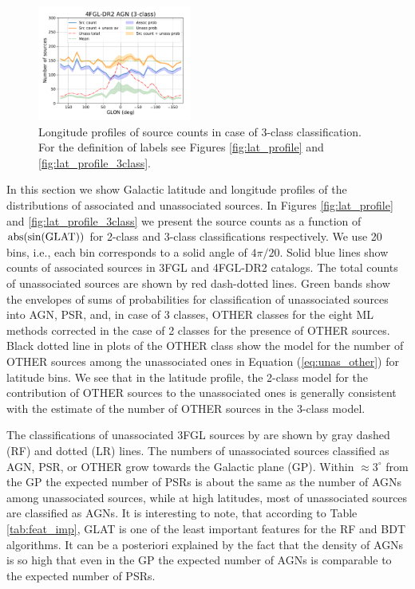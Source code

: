 \begin{figure}[h]
\includegraphics[width=0.45\textwidth]{plots/lon_profile_AGN_4FGL-DR2_3classes.pdf}
\caption{Longitude profiles of source counts in case of 3-class classification. For the definition of labels see Figures \ref{fig:lat_profile} and \ref{fig:lat_profile_3class}.}  
\label{fig:lon_profile_3class}
\end{figure}


In this section we show Galactic latitude and longitude profiles of the distributions of associated and unassociated sources.
In Figures \ref{fig:lat_profile} and \ref{fig:lat_profile_3class} we present the source counts as a function of ${\rm abs(sin(GLAT))}$ 
for 2-class and 3-class classifications respectively.
We use 20 bins, i.e., each bin corresponds to a solid angle of $4 \pi / 20$. 
Solid blue lines show counts of associated sources in 3FGL and 4FGL-DR2  catalogs.
The total counts of unassociated sources are shown by red dash-dotted lines.
Green bands show the envelopes of sums of probabilities for classification of unassociated sources into AGN, PSR, and, in case of 3 classes, OTHER classes for the eight ML methods corrected in the case of 2 classes for the presence of OTHER sources.
Black dotted line in plots of the OTHER class show the model for the number of OTHER sources among the unassociated ones
in Equation (\ref{eq:unas_other}) for latitude bins.
We see that in the latitude profile, the 2-class model for the contribution of OTHER sources to the unassociated ones is generally consistent with the estimate of the number of OTHER sources in the 3-class model.

The classifications of unassociated 3FGL sources by \cite{2016ApJ...820....8S} are shown by gray dashed (RF) and dotted (LR) lines.
The numbers of unassociated sources classified as AGN, PSR, or OTHER grow towards the Galactic plane (GP).
Within $\approx 3^\circ$ from the GP the expected number of PSRs is about the same as the number of AGNs among unassociated sources, while at high latitudes, most of unassociated sources are classified as AGNs.
It is interesting to note, that according to Table \ref{tab:feat_imp}, GLAT is one of the least important features for the RF and BDT algorithms.
It can be a posteriori explained by the fact that the density of AGNs is so high that even in the GP the expected number of AGNs is comparable to the expected number of PSRs.

